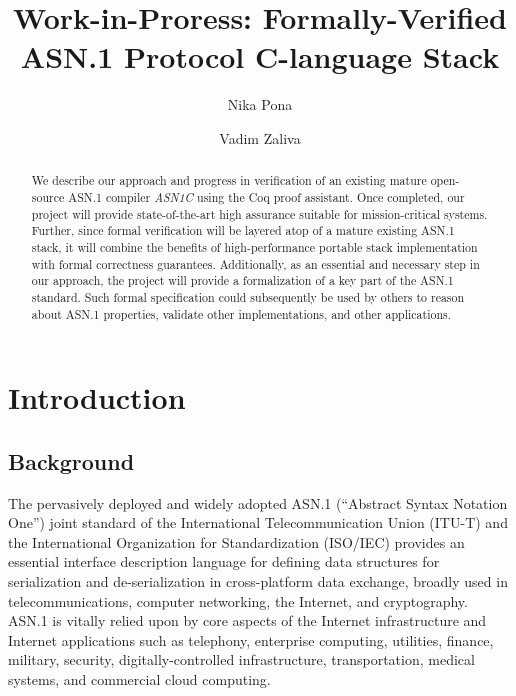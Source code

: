 \documentclass[acmsmall,nonacm]{acmart}
\begin{document}
\title{Work-in-Proress: Formally-Verified ASN.1 Protocol C-language Stack}

\author{Nika Pona}
\author{Vadim Zaliva}

\begin{abstract}

  We describe our approach and progress in verification of an existing
  mature open-source ASN.1 compiler \emph{ASN1C} using the Coq proof
  assistant. Once completed, our project will provide state-of-the-art
  high assurance suitable for mission-critical systems. Further, since
  formal verification will be layered atop of a mature existing ASN.1
  stack, it will combine the benefits of high-performance portable
  stack implementation with formal correctness
  guarantees. Additionally, as an essential and necessary step in our
  approach, the project will provide a formalization of a key part of
  the ASN.1 standard. Such formal specification could subsequently be
  used by others to reason about ASN.1 properties, validate other
  implementations, and other applications.

\end{abstract}

\maketitle

\tableofcontents

\section{Introduction}

\subsection{Background}

The pervasively deployed and widely adopted ASN.1 (``Abstract Syntax
Notation One'') \cite{ASN1Intro} joint standard of the International
Telecommunication Union (ITU-T) and the International Organization for
Standardization (ISO/IEC) provides an essential interface description
language for defining data structures for serialization and
de-serialization in cross-platform data exchange, broadly used in
telecommunications, computer networking, the Internet, and
cryptography. ASN.1 is vitally relied upon by core aspects of the
Internet infrastructure and Internet applications such as telephony,
enterprise computing, utilities, finance, military, security,
digitally-controlled infrastructure, transportation, medical systems,
and commercial cloud computing.
\end{document}
